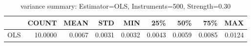 \begin{table}[ht]
\centering
\caption{variance summary: Estimator=OLS, Instruments=500, Strength=0.30}
\begin{tabular}{lrrrrrrrr}
\toprule
 & COUNT & MEAN & STD & MIN & 25\% & 50\% & 75\% & MAX \\
\midrule
OLS & 10.0000 & 0.0067 & 0.0031 & 0.0032 & 0.0043 & 0.0059 & 0.0085 & 0.0124 \\
\bottomrule
\end{tabular}
\end{table}
